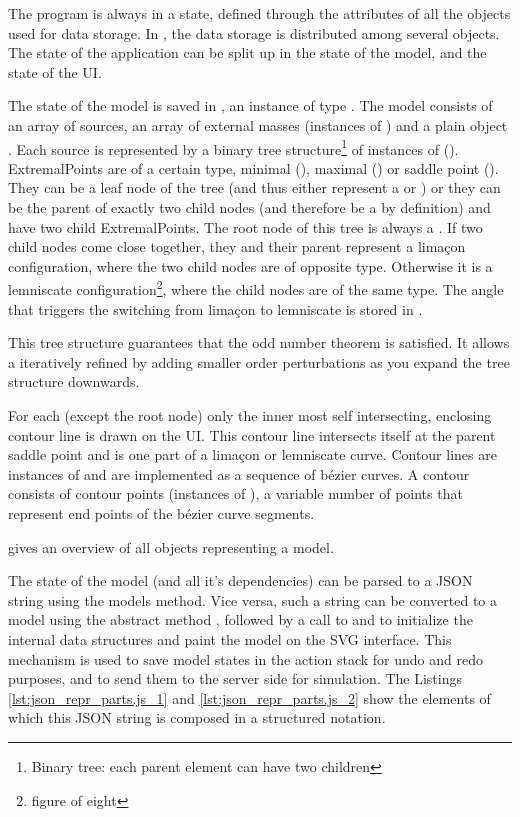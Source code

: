 The program is always in a state, defined through the attributes of all the objects used for data storage.
In \spl, the data storage is distributed among several objects.
The state of the application can be split up in the state of the model, and the state of the UI.

The state of the model is saved in , an instance of type .
The model  consists of an array of sources, an array of external masses (instances of ) and a plain object .
Each source is represented by a binary tree structure\footnote{Binary tree: each parent element can have two children} of instances of  ().
ExtremalPoints are of a certain type, minimal (), maximal () or saddle point ().
They can be a leaf node of the tree (and thus either represent a  or ) or they can be the parent of exactly two child nodes (and therefore be a  by definition) and have two child ExtremalPoints.
The root node of this tree is always a .
If two child nodes come close together, they and their parent represent a limaçon configuration, where the two child nodes are of opposite type.
Otherwise it is a lemniscate configuration\footnote{figure of eight}, where the child nodes are of the same type.
The angle that triggers the switching from limaçon to lemniscate is stored in .

This tree structure guarantees that the odd number theorem is satisfied.
It allows a iteratively refined by adding smaller order perturbations as you expand the tree structure downwards.


For each  (except the root node) only the inner most self intersecting, enclosing contour line is drawn on the UI.
This contour line intersects itself at the parent saddle point and is one part of a limaçon or lemniscate curve.
Contour lines are instances of  and are implemented as a sequence of bézier curves.
A contour consists of contour points (instances of ), a variable number of points that represent end points of the bézier curve segments.

 gives an overview of all objects representing a model.

The state of the model (and all it's dependencies) can be parsed to a JSON string using the models  method.
Vice versa, such a string can be converted to a model using the abstract method , followed by a call to  and  to initialize the internal data structures and paint the model on the SVG interface.
This mechanism is used to save model states in the action stack for undo and redo purposes, and to send them to the server side for simulation.
The Listings \ref{lst:json_repr_parts.js_1} and \ref{lst:json_repr_parts.js_2} show the elements of which this JSON string is composed in a structured notation.


